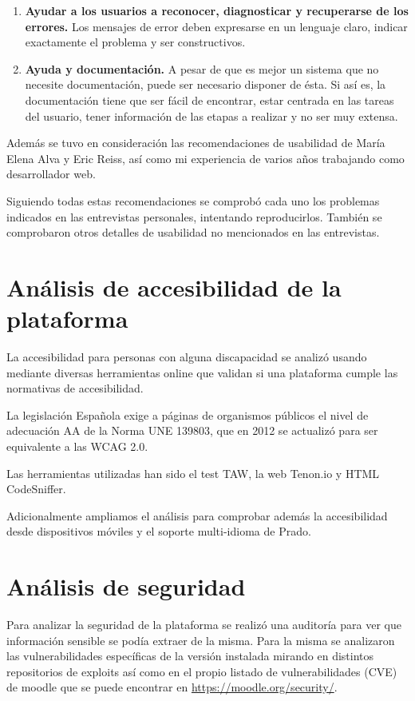 \begin{enumerate}
\item \textbf{Ayudar a los usuarios a reconocer, diagnosticar y recuperarse de los errores.} Los mensajes de error deben expresarse en un lenguaje claro, indicar exactamente el problema y ser constructivos.
\item \textbf{Ayuda y documentación.} A pesar de que es mejor un sistema que no necesite documentación, puede ser necesario disponer de ésta. Si así es, la documentación tiene que ser fácil de encontrar, estar centrada en las tareas del usuario, tener información de las etapas a realizar y no ser muy extensa.
\end{enumerate}
	

Además se tuvo en consideración las recomendaciones de usabilidad de María Elena Alva\cite{melenaalva} y Eric Reiss\cite{ericreiss}, así como mi experiencia de varios años trabajando como desarrollador web.

\bigskip
Siguiendo todas estas recomendaciones se comprobó cada uno los problemas indicados en las entrevistas personales, intentando reproducirlos. También se comprobaron otros detalles de usabilidad no mencionados en las entrevistas.

\section{Análisis de accesibilidad de la plataforma}

La accesibilidad para personas con alguna discapacidad se analizó usando mediante diversas herramientas online que validan si una plataforma cumple las normativas de accesibilidad.

\bigskip
La legislación Española exige a páginas de organismos públicos el nivel de adecuación AA de la Norma UNE 139803, que en 2012 se actualizó para ser equivalente a las WCAG 2.0. 

\bigskip
Las herramientas utilizadas han sido el test TAW\cite{taw}, la web Tenon.io\cite{tenon} y HTML CodeSniffer\cite{codesniffer}.

\bigskip
Adicionalmente ampliamos el análisis para comprobar además la accesibilidad desde dispositivos móviles y el soporte multi-idioma de Prado.

\section{Análisis de seguridad}

Para analizar la seguridad de la plataforma se realizó una auditoría para ver que información sensible se podía extraer de la misma. Para la misma se analizaron las vulnerabilidades específicas de la versión instalada mirando en distintos repositorios de exploits así como en el propio listado de vulnerabilidades (CVE) de moodle que se puede encontrar en \url{https://moodle.org/security/}.

